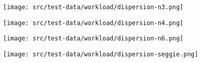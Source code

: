 \begin{figure}[htp]
\centering
\texttt{[image: src/test-data/workload/dispersion-n3.png]}
\label{fig:appdispn3}
\end{figure}

\begin{figure}[htp]
\centering
\texttt{[image: src/test-data/workload/dispersion-n4.png]}
\label{fig:appdispn4}
\end{figure}

\begin{figure}[htp]
\centering
\texttt{[image: src/test-data/workload/dispersion-n6.png]}
\label{fig:appdispn6}
\end{figure}

\begin{figure}[htp]
\centering
\texttt{[image: src/test-data/workload/dispersion-seggie.png]}
\label{fig:appdispseggie}
\end{figure}

